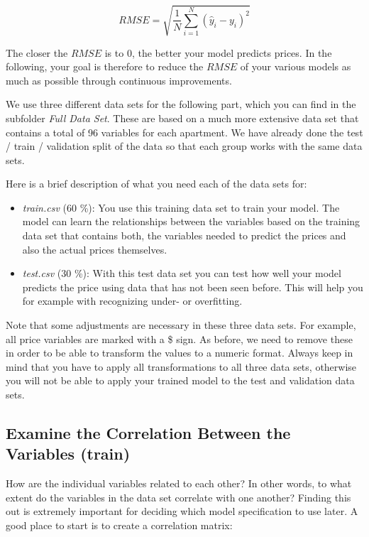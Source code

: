 \documentclass[
  11pt,
]{article}
\begin{document}
\[ RMSE = \sqrt{\frac{1}{N}\sum_{i=1}^{N}{(\hat{y}_i-y_i)^2}} \]

The closer the \(RMSE\) is to 0, the better your model predicts prices. In the following, your goal is therefore to reduce the \(RMSE\) of your various models as much as possible through continuous improvements.

We use three different data sets for the following part, which you can find in the subfolder \emph{Full Data Set}. These are based on a much more extensive data set that contains a total of 96 variables for each apartment. We have already done the test / train / validation split of the data so that each group works with the same data sets.

Here is a brief description of what you need each of the data sets for:

\begin{itemize}
\item
  \emph{train.csv} (60 \%): You use this training data set to train your model. The model can learn the relationships between the variables based on the training data set that contains both, the variables needed to predict the prices and also the actual prices themselves.
\item
  \emph{test.csv} (30 \%): With this test data set you can test how well your model predicts the price using data that has not been seen before. This will help you for example with recognizing under- or overfitting.
\end{itemize}

Note that some adjustments are necessary in these three data sets. For example, all price variables are marked with a \$ sign. As before, we need to remove these in order to be able to transform the values to a numeric format. Always keep in mind that you have to apply all transformations to all three data sets, otherwise you will not be able to apply your trained model to the test and validation data sets.

\hypertarget{examine-the-correlation-between-the-variables-train}{%
\subsection{Examine the Correlation Between the Variables (train)}\label{examine-the-correlation-between-the-variables-train}}

How are the individual variables related to each other? In other words, to what extent do the variables in the data set correlate with one another? Finding this out is extremely important for deciding which model specification to use later. A good place to start is to create a correlation matrix:
\end{document}
